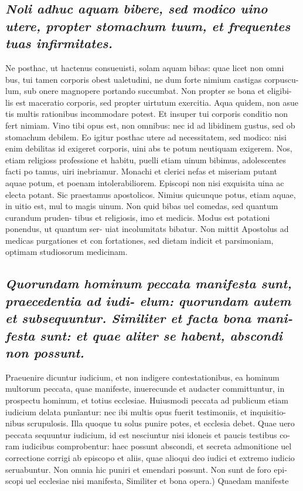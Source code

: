 \documentclass{article}
\begin{document}
\begin{pages}
\subsection*{\textit{Noli adhuc aquam bibere, sed modico uino utere, propter stomachum tuum, et frequentes tuas infirmitates. }}\pstart Ne posthac, ut hactenus consueuisti, solam aquam bibas: quae licet non omni bus, tui tamen corporis obest ualetudini, ne dum forte nimium castigas corpuscu- lum, sub onere magnopere portando succumbat. Non propter se bona et eligibi- lis est maceratio corporis, sed propter uirtutum exercitia. Aqua quidem, non asue tis multis rationibus incommodare potest. Et insuper tui corporis conditio non fert nimiam. Vino tibi opus est, non omnibus: nec id ad libidinem gustus, sed ob stomachum debilem. Eo igitur posthac utere ad necessitatem, sed modico: nisi enim debilitas id exigeret corporis, uini abs te potum neutiquam exigerem. Nos, etiam religioss professione et habitu, puelli etiam uinum bibimus, adolescentes facti po tamus, uiri inebriamur. Monachi et clerici nefas et miseriam putant aquae potum, et poenam intolerabiliorem. Episcopi non nisi exquisita uina ac electa potant. Sic praestamus apostolicos. Nimius quicunque potus, etiam aquae, in uitio est, mul to magis uinum. Non quid bibas uel comedas, sed quantum curandum pruden- tibus et religiosis, imo et medicis. Modus est potationi ponendus, ut quantum ser- uiat incolumitats bibatur. Non mittit Apostolus ad medicas purgationes et con fortationes, sed dietam indicit et parsimoniam, optimam studiosorum medicinam.  \pend
{}
{}
\subsection*{\textit{Quorundam hominum peccata manifesta sunt, praecedentia ad iudi- elum: quorundam autem et subsequuntur. Similiter et facta bona mani- festa sunt: et quae aliter se habent, abscondi non possunt. }}\pstart Praeuenire dicuntur iudicium, et non indigere contestationibus, ea hominum multorum peccata, quae manifeste, inuerecunde et audacter committuntur, in prospectu hominum, et totius ecclesiae. Huiusmodi peccata ad publicum etiam iudicium delata punĩantur: nec ibi multis opus fuerit testimoniis, et inquisitio- nibus scrupulosis. Illa quoque tu solus punire potes, et ecclesia debet. Quae uero peccata sequuntur iudicium, id est nesciuntur nisi idoneis et paucis testibus co- ram iudicibus comprobentur: haec possunt abscondi, et secreta admonitione uel correctione corrigi ab episcopo et aliis, quae alioqui deo iudici et extremo iudicio seruabuntur. Non omnia hic puniri et emendari possunt. Non sunt de foro epi- scopi uel ecclesiae nisi manifesta, Similiter et bona opera.) Quaedam manifeste  \pend

\end{pages}
\end{document}
